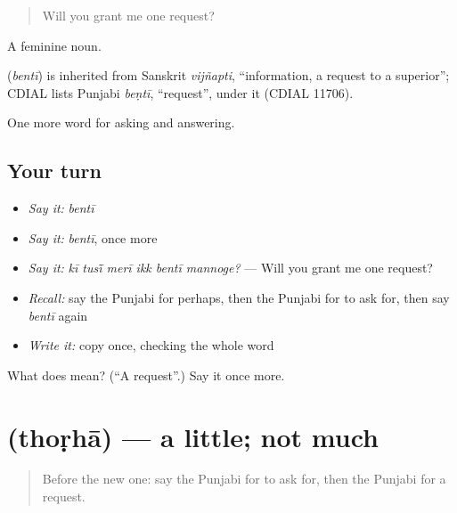 \begin{quote}
Will you grant me one request?
\end{quote}

A feminine noun.

\begin{cousinweb}
\textbf{} (\emph{bentī}) is inherited from Sanskrit \emph{vijñapti}, \textquotedblleft{}information, a request to a superior\textquotedblright{}; CDIAL lists Punjabi \emph{beṇtī}, \textquotedblleft{}request\textquotedblright{}, under it (CDIAL 11706).
\end{cousinweb}

\begin{grammarlens}[title={What you've built}]
One more word for asking and answering.
\end{grammarlens}

\subsection*{Your turn}
\begin{itemize}
\raggedright
  \item \emph{Say it:} \emph{bentī}
  \item \emph{Say it:} \emph{bentī}, once more
  \item \emph{Say it:} \emph{kī tusī̃ merī ikk bentī mannoge?} — Will you grant me one request?
  \item \emph{Recall:} say the Punjabi for perhaps, then the Punjabi for to ask for, then say \emph{bentī} again
  \item \emph{Write it:} copy \textbf{} once, checking the whole word
\end{itemize}

\begin{tcolorbox}[breakable,colback=teal!4,colframe=teal!35!black,title={Before you move on}]
What does  mean? (\textquotedblleft{}A request\textquotedblright{}.) Say it once more.
\end{tcolorbox}
\section[\texorpdfstring{\pa{ਥੋੜ੍ਹਾ} (thoṛhā)}{ਥੋੜ੍ਹਾ (thoṛhā)}]{ (thoṛhā) — a little; not much}

\label{lesson:PA-C337-thorha}



\begin{quote}
Before the new one: say the Punjabi for to ask for, then the Punjabi for a request.
\end{quote}

